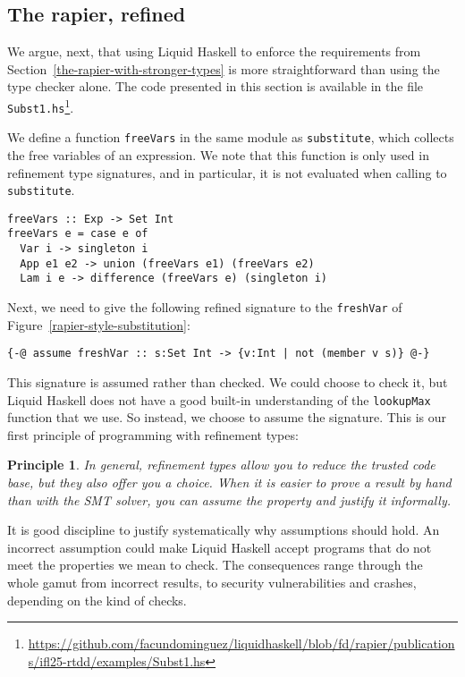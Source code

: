 \documentclass[sigconf, review]{acmart}
\newcommand{\tc}[1]{{\small\texttt{#1}}}
\newcommand{\sourcefile}[1]{\tc{#1}\footnote{\scriptsize\url{https://github.com/facundominguez/liquidhaskell/blob/fd/rapier/publications/ifl25-rtdd/examples/#1}}}
\newtheorem{principle}{Principle}
\begin{document}
\subsection{The rapier, refined}
\label{the-rapier-with-refinement-types}

We argue, next, that using Liquid Haskell to enforce the
requirements from Section~\ref{the-rapier-with-stronger-types} is more
straightforward than using the type checker alone. The code presented in this section is available in the file
\sourcefile{Subst1.hs}.

We define a function \tc{freeVars} in the same module as \tc{subs\-ti\-tute},
which collects the free variables of an expression. We note that this function
is only used in refinement type signatures, and in particular, it is not evaluated
when calling to \tc{substitute}.

\begin{verbatim}
freeVars :: Exp -> Set Int
freeVars e = case e of
  Var i -> singleton i
  App e1 e2 -> union (freeVars e1) (freeVars e2)
  Lam i e -> difference (freeVars e) (singleton i)
\end{verbatim}

Next, we need to give the following refined signature to the \tc{freshVar} of
Figure~\ref{rapier-style-substitution}:
\begin{verbatim}
{-@ assume freshVar :: s:Set Int -> {v:Int | not (member v s)} @-}
\end{verbatim}
This signature is assumed rather than checked. We could choose to check it, but
Liquid Haskell does not have a good built-in understanding of the \tc{lookupMax}
function that we use. So instead, we choose to assume the signature. This is our
first principle of programming with refinement types:

\begin{principle}
\label{assumption-principle}
  In general, refinement types allow you to reduce the trusted code base, but they also offer
    you a choice. When it is easier to prove a result by
    hand than with the SMT solver, you can assume the property and
    justify it informally.
\end{principle}

It is good discipline to justify systematically why assumptions should hold.
An incorrect assumption could make Liquid Haskell accept programs that do not
meet the properties we mean to check. The consequences range through the whole
gamut from incorrect results, to security vulnerabilities and crashes, depending
on the kind of checks.
\end{document}
